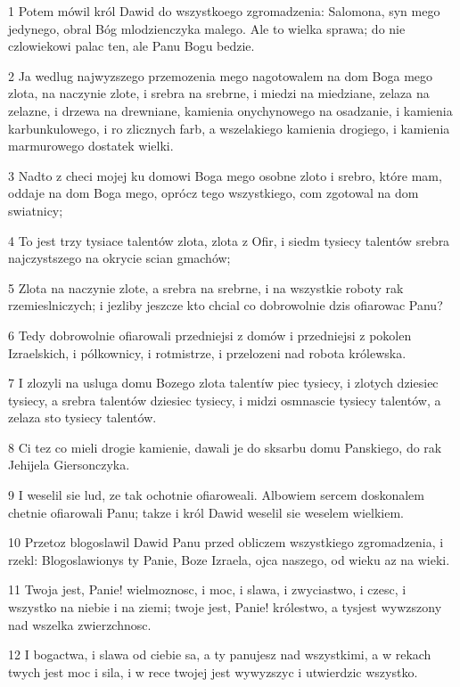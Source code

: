 \par 1 Potem mówil król Dawid do wszystkoego zgromadzenia: Salomona, syn mego jedynego, obral Bóg mlodzienczyka malego. Ale to wielka sprawa; do nie czlowiekowi palac ten, ale Panu Bogu bedzie.
\par 2 Ja wedlug najwyzszego przemozenia mego nagotowalem na dom Boga mego zlota, na naczynie zlote, i srebra na srebrne, i miedzi na miedziane, zelaza na zelazne, i drzewa na drewniane, kamienia onychynowego na osadzanie, i kamienia karbunkulowego, i ro zlicznych farb, a wszelakiego kamienia drogiego, i kamienia marmurowego dostatek wielki.
\par 3 Nadto z checi mojej ku domowi Boga mego osobne zloto i srebro, które mam, oddaje na dom Boga mego, oprócz tego wszystkiego, com zgotowal na dom swiatnicy;
\par 4 To jest trzy tysiace talentów zlota, zlota z Ofir, i siedm tysiecy talentów srebra najczystszego na okrycie scian gmachów;
\par 5 Zlota na naczynie zlote, a srebra na srebrne, i na wszystkie roboty rak rzemieslniczych; i jezliby jeszcze kto chcial co dobrowolnie dzis ofiarowac Panu?
\par 6 Tedy dobrowolnie ofiarowali przedniejsi z domów i przedniejsi z pokolen Izraelskich, i pólkownicy, i rotmistrze, i przelozeni nad robota królewska.
\par 7 I zlozyli na usluga domu Bozego zlota talentíw piec tysiecy, i zlotych dziesiec tysiecy, a srebra talentów dziesiec tysiecy, i midzi osmnascie tysiecy talentów, a zelaza sto tysiecy talentów.
\par 8 Ci tez co mieli drogie kamienie, dawali je do sksarbu domu Panskiego, do rak Jehijela Giersonczyka.
\par 9 I weselil sie lud, ze tak ochotnie ofiaroweali. Albowiem sercem doskonalem chetnie ofiarowali Panu; takze i król Dawid weselil sie weselem wielkiem.
\par 10 Przetoz blogoslawil Dawid Panu przed obliczem wszystkiego zgromadzenia, i rzekl: Blogoslawionys ty Panie, Boze Izraela, ojca naszego, od wieku az na wieki.
\par 11 Twoja jest, Panie! wielmoznosc, i moc, i slawa, i zwyciastwo, i czesc, i wszystko na niebie i na ziemi; twoje jest, Panie! królestwo, a tysjest wywzszony nad wszelka zwierzchnosc.
\par 12 I bogactwa, i slawa od ciebie sa, a ty panujesz nad wszystkimi, a w rekach twych jest moc i sila, i w rece twojej jest wywyzszyc i utwierdzic wszystko.

